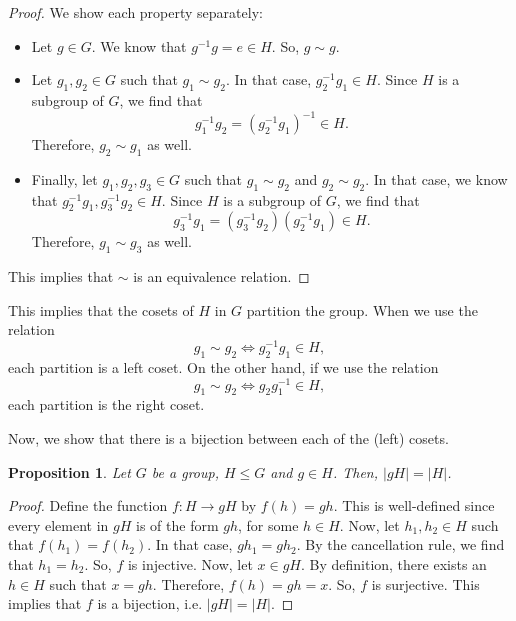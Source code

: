 \documentclass[a4paper, openany]{memoir}
\theoremstyle{definition}
\theoremstyle{plain}
\newtheorem{proposition}[definition]{Proposition}
\begin{document}
\begin{proof}
We show each property separately:
\begin{itemize}
    \item Let $g \in G$. We know that $g^{-1}g = e \in H$. So, $g \sim g$.
    
    \item Let $g_1, g_2 \in G$ such that $g_1 \sim g_2$. In that case, $g_2^{-1} g_1 \in H$. Since $H$ is a subgroup of $G$, we find that
    \[g_1^{-1}g_2 = (g_2^{-1}g_1)^{-1} \in H.\]
    Therefore, $g_2 \sim g_1$ as well.
    
    \item Finally, let $g_1, g_2, g_3 \in G$ such that $g_1 \sim g_2$ and $g_2 \sim g_2$. In that case, we know that $g_2^{-1}g_1, g_3^{-1}g_2 \in H$. Since $H$ is a subgroup of $G$, we find that
    \[g_3^{-1}g_1 = (g_3^{-1}g_2)(g_2^{-1}g_1) \in H.\]
    Therefore, $g_1 \sim g_3$ as well.
\end{itemize}
This implies that $\sim$ is an equivalence relation.
\end{proof}
\noindent This implies that the cosets of $H$ in $G$ partition the group. When we use the relation 
\[g_1 \sim g_2 \iff g_2^{-1} g_1 \in H,\]
each partition is a left coset. On the other hand, if we use the relation
\[g_1 \sim g_2 \iff g_2 g_1^{-1} \in H,\]
each partition is the right coset.

Now, we show that there is a bijection between each of the (left) cosets.
\begin{proposition}
Let $G$ be a group, $H \leqslant G$ and $g \in H$. Then, $|gH| = |H|$.
\end{proposition}
\begin{proof}
Define the function $f: H \to gH$ by $f(h) = gh$. This is well-defined since every element in $gH$ is of the form $gh$, for some $h \in H$. Now, let $h_1, h_2 \in H$ such that $f(h_1) = f(h_2)$. In that case, $gh_1 = gh_2$. By the cancellation rule, we find that $h_1 = h_2$. So, $f$ is injective. Now, let $x \in gH$. By definition, there exists an $h \in H$ such that $x = gh$. Therefore, $f(h) = gh = x$. So, $f$ is surjective. This implies that $f$ is a bijection, i.e. $|gH| = |H|$.
\end{proof}
\end{document}
